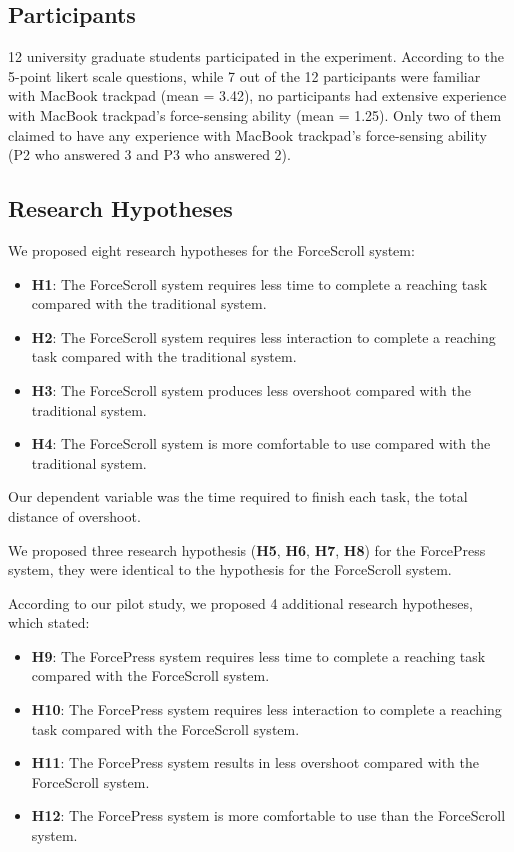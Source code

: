 \documentclass{sigchi}
\begin{document}
\subsection{Participants}
12 university graduate students participated in the experiment. According to the 5-point likert scale questions, while 7 out of the 12 participants were familiar with MacBook trackpad (mean = 3.42), no participants had extensive experience with MacBook trackpad's force-sensing ability (mean = 1.25). Only two of them claimed to have any experience with MacBook trackpad's force-sensing ability (P2 who answered 3 and P3 who answered 2).
    
\subsection{Research Hypotheses}

We proposed eight research hypotheses for the ForceScroll system:

\begin{itemize}
    \item \textbf{H1}: The ForceScroll system requires less time to complete a reaching task compared with the traditional system.
    \item \textbf{H2}: The ForceScroll system requires less interaction to complete a reaching task compared with the traditional system.
    \item \textbf{H3}: The ForceScroll system produces less overshoot compared with the traditional system.
    \item \textbf{H4}: The ForceScroll system is more comfortable to use compared with the traditional system.
\end{itemize}

Our dependent variable was the time required to finish each task, the total distance of overshoot.

We proposed three research hypothesis (\textbf{H5}, \textbf{H6}, \textbf{H7}, \textbf{H8}) for the ForcePress system, they were identical to the hypothesis for the ForceScroll system.

According to our pilot study, we proposed 4 additional research hypotheses, which stated:
\begin{itemize}
    \item \textbf{H9}: The ForcePress system requires less time to complete a reaching task compared with the ForceScroll system.
    \item \textbf{H10}: The ForcePress system requires less interaction to complete a reaching task compared with the ForceScroll system.
    \item \textbf{H11}: The ForcePress system results in less overshoot compared with the ForceScroll system.
    \item \textbf{H12}: The ForcePress system is more comfortable to use than the ForceScroll system.
\end{itemize}
\end{document}
